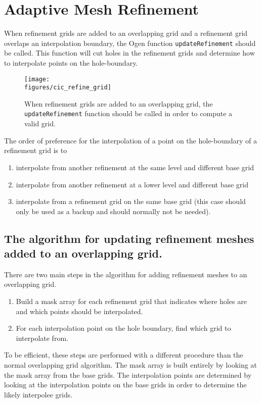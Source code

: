 \clearpage
\section{Adaptive Mesh Refinement} 

  When refinement grids are added to an overlapping grid and a refinement grid
overlaps an interpolation boundary, the Ogen function {\tt updateRefinement}
should be called. This function will cut holes in the refinement grids and
determine how to interpolate points on the hole-boundary. 

\begin{figure}[hbt]
\begin{center}
   \texttt{[image: \\figures/cic\_refine\_grid]}
\end{center}
\caption{When refinement grids are added to an overlapping grid, the {\tt updateRefinement} function
   should be called in order to compute a valid grid.}
\end{figure}

The order of preference for the interpolation of a point on the hole-boundary
of a refinement grid is to
\begin{enumerate}
   \item interpolate from another refinement at the same level and different base grid
   \item interpolate from another refinement at a lower level and different base grid
   \item interpolate from a refinement grid on the same base grid (this case should only be used as a backup
         and should normally not be needed).
\end{enumerate}
  

\subsection{The algorithm for updating refinement meshes added to an overlapping grid.}

  There are two main steps in the algorithm for adding refinement meshes to an overlapping grid.
\begin{enumerate}
  \item Build a mask array for each refinement grid that indicates where holes are and which points
      should be interpolated.
  \item For each interpolation point on the hole boundary, find which grid to interpolate from.
\end{enumerate}
To be efficient, these steps are performed with a different procedure than the normal overlapping
grid algorithm. The mask array is built entirely by looking at the mask array from the base grids.
The interpolation points are determined by looking at the interpolation points on the base grids
in order to determine the likely interpolee grids.





